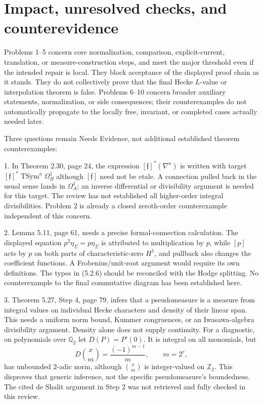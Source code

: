 \documentclass[10pt]{article}
\begin{document}
\section*{Impact, unresolved checks, and counterevidence}
Problems 1–5 concern core normalization, comparison, explicit-current, translation, or measure-construction steps, and meet the major threshold even if the intended repair is local. They block acceptance of the displayed proof chain as it stands. They do not collectively prove that the final Hecke \(L\)-value or interpolation theorem is false. Problems 6–10 concern broader auxiliary statements, normalization, or side consequences; their counterexamples do not automatically propagate to the locally free, invariant, or completed cases actually needed later.\par
Three questions remain Needs Evidence, not additional established theorem counterexamples:\par
1. In Theorem 2.30, page 24, the expression \([\mathfrak f]^*(\nabla^a)\) is written with target \([\mathfrak f]^*\operatorname{TSym}^a\Omega_B^1\) although \([\mathfrak f]\) need not be etale. A connection pulled back in the usual sense lands in \(\Omega_A^1\); an inverse differential or divisibility argument is needed for this target. The review has not established all higher-order integral divisibilities. Problem 2 is already a closed zeroth-order counterexample independent of this concern.\par
2. Lemma 5.11, page 61, needs a precise formal-connection calculation. The displayed equation \(p^2\eta_\Sigma=p\eta_\Sigma\) is attributed to multiplication by \(p\), while \([p]\) acts by \(p\) on both parts of characteristic-zero \(H^1\), and pullback also changes the coefficient functions. A Frobenius/unit-root argument would require its own definitions. The types in (5.2.6) should be reconciled with the Hodge splitting. No counterexample to the final commutative diagram has been established here.\par
3. Theorem 5.27, Step 4, page 79, infers that a pseudomeasure is a measure from integral values on individual Hecke characters and density of their linear span. This needs a uniform norm bound, Kummer congruences, or an Iwasawa-algebra divisibility argument. Density alone does not supply continuity. For a diagnostic, on polynomials over \(\mathbb Q_2\) let \(D(P)=P'(0)\). It is integral on all monomials, but \[D\binom{x}{m}=\frac{(-1)^{m-1}}m,\qquad m=2^r,\] has unbounded \(2\)-adic norm, although \(\binom{x}{m}\) is integer-valued on \(\mathbb Z_2\). This disproves that generic inference, not the specific pseudomeasure’s boundedness. The cited de Shalit argument in Step 2 was not retrieved and fully checked in this review.\par
\end{document}
